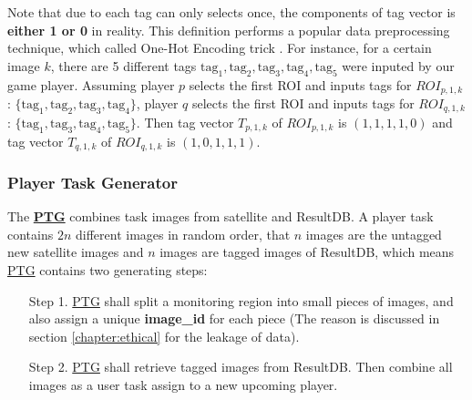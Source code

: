 
Note that due to each tag can only selects once, the components of tag vector is \textbf{either 1 or 0} in reality.
This definition performs a popular data preprocessing technique, which called One-Hot Encoding trick \cite{wu2012foundations, liu2002discretization}.
For instance, for a certain image $k$,
there are 5 different tags $\text{tag}_1, \text{tag}_2, \text{tag}_3, \text{tag}_4, \text{tag}_5$ were inputed
by our game player.
Assuming player $p$ selects the first ROI and inputs tags for $ROI_{p, 1, k}$: 
$\{\text{tag}_1, \text{tag}_2, \text{tag}_3, \text{tag}_4\}$, 
player $q$ selects the first ROI and inputs tags for $ROI_{q, 1, k}$:
$\{\text{tag}_1, \text{tag}_3, \text{tag}_4, \text{tag}_5\}$. 
Then tag vector $T_{p, 1, k}$ of $ROI_{p, 1, k}$ is $(1, 1, 1, 1, 0)$ and tag vector
$T_{q, 1, k}$ of $ROI_{q, 1, k}$ is $(1, 0, 1, 1, 1)$.

\subsubsection{Player Task Generator}

The \textbf{\hyperref[idx:ptg]{PTG}} combines task images from satellite and ResultDB.
A player task contains $2n$ different images in random order, that $n$ images are
the untagged new satellite images and $n$ images are tagged images of ResultDB, which means
\hyperref[idx:ptg]{PTG} contains two generating steps:

\begin{itemize}
\item [Step 1.] \hyperref[idx:ptg]{PTG} shall split a monitoring region into small pieces of images, 
and also assign a unique \textbf{image\_id} for each piece 
(The reason is discussed in section \ref{chapter:ethical} for the leakage of data).

\item [Step 2.] \hyperref[idx:ptg]{PTG} shall retrieve tagged images from ResultDB. Then combine
all images as a user task assign to a new upcoming player.
\end{itemize}

